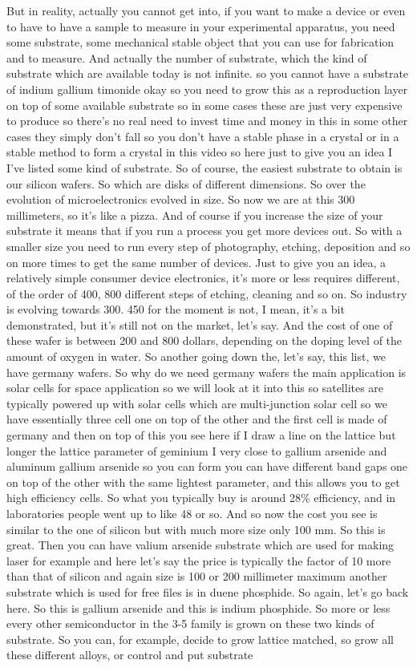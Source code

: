But in reality, actually you cannot get into, if you want to make a device or even to have to have a sample to measure in your experimental apparatus, you need some substrate, some mechanical stable object that you can use for fabrication and to measure. And actually the number of substrate, which the kind of substrate which are available today is not infinite. so you cannot have a substrate of indium gallium timonide okay so you need to grow this as a reproduction layer on top of some available substrate so in some cases these are just very expensive to produce so there's no real need to invest time and money in this in some other cases they simply don't fall so you don't have a stable phase in a crystal or in a stable method to form a crystal in this video so here just to give you an idea I I've listed some kind of substrate. So of course, the easiest substrate to obtain is our silicon wafers. So which are disks of different dimensions. So over the evolution of microelectronics evolved in size. So now we are at this 300 millimeters, so it's like a pizza. And of course if you increase the size of your substrate it means that if you run a process you get more devices out. So with a smaller size you need to run every step of photography, etching, deposition and so on more times to get the same number of devices. Just to give you an idea, a relatively simple consumer device electronics, it's more or less requires different, of the order of 400, 800 different steps of etching, cleaning and so on. So industry is evolving towards 300. 450 for the moment is not, I mean, it's a bit demonstrated, but it's still not on the market, let's say. And the cost of one of these wafer is between 200 and 800 dollars, depending on the doping level of the amount of oxygen in water. So another going down the, let's say, this list, we have germany wafers. So why do we need germany wafers the main application is solar cells for space application so we will look at it into this so satellites are typically powered up with solar cells which are multi-junction solar cell so we have essentially three cell one on top of the other and the first cell is made of germany and then on top of this you see here if I draw a line on the lattice but longer the lattice parameter of geminium I very close to gallium arsenide and aluminum gallium arsenide so you can form you can have different band gaps one on top of the other with the same lightest parameter, and this allows you to get high efficiency cells. So what you typically buy is around 28\% efficiency, and in laboratories people went up to like 48 or so. And so now the cost you see is similar to the one of silicon but with much more size only 100 mm. So this is great. Then you can have valium arsenide substrate which are used for making laser for example and here let's say the price is typically the factor of 10 more than that of silicon and again size is 100 or 200 millimeter maximum another substrate which is used for free files is in duene phosphide. So again, let's go back here. So this is gallium arsenide and this is indium phosphide. So more or less every other semiconductor in the 3-5 family is grown on these two kinds of substrate. So you can, for example, decide to grow lattice matched, so grow all these different alloys, or control and put substrate 